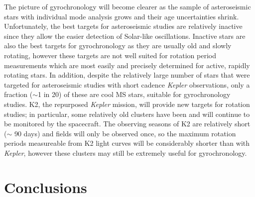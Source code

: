 \documentclass[10pt,preprint]{aastex}
\begin{document}
The picture of gyrochronology will become clearer as the sample of asteroseismic stars with individual mode analysis grows and their age uncertainties shrink.
Unfortunately, the best targets for asteroseismic studies are relatively inactive since they allow the easier detection of Solar-like oscillations.
Inactive stars are also the best targets for gyrochronology as they are usually old and slowly rotating, however these targets are not well suited for rotation period measurements which are most easily and precisely determined for active, rapidly rotating stars.
In addition, despite the relatively large number of stars that were targeted for asteroseismic studies with short cadence {\it Kepler} observations, only a fraction ($\sim$1 in 20) of these are cool MS stars, suitable for gyrochronology studies.
K2, the repurposed {\it Kepler} mission, will provide new targets for rotation studies; in particular, some relatively old clusters have been and will continue to be monitored by the spacecraft.
The observing seasons of K2 are relatively short ($\sim$ 90 days) and fields will only be observed once, so the maximum rotation periods measureable from K2 light curves will be considerably shorter than with {\it Kepler}, however these clusters may still be extremely useful for gyrochronology.

\section{Conclusions}
\label{sec:conclusions}
\end{document}
